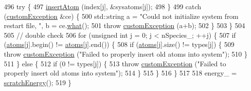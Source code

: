 \begin{DoxyCode}
496                                 \textcolor{keywordflow}{try} \{
497                                                 \hyperlink{classsim_system_a6c1e86f585f3a52aa82b6394ffbf1c6a}{insertAtom} (index[j], &sysatoms[j]);
498                                 \}
499                                 \textcolor{keywordflow}{catch} (\hyperlink{classcustom_exception}{customException} &ce) \{
500                                                 std::string a = \textcolor{stringliteral}{"Could not initialize system from restart
       file, "}, b = ce.\hyperlink{classcustom_exception_aeb6ab5848b038adfc68fde86a512f691}{what}();
501                                                 \textcolor{keywordflow}{throw} \hyperlink{classcustom_exception}{customException} (a+b);
502                                 \}
503                 \}
504                 
505                 \textcolor{comment}{// double check}
506                 \textcolor{keywordflow}{for} (\textcolor{keywordtype}{unsigned} \textcolor{keywordtype}{int} j = 0; j < nSpecies\_; ++j) \{
507                                 \textcolor{keywordflow}{if} (\hyperlink{classsim_system_a90421b19082f7fb8fc23b7264b1161e4}{atoms}[j].begin() != \hyperlink{classsim_system_a90421b19082f7fb8fc23b7264b1161e4}{atoms}[j].end()) \{
508                                                 \textcolor{keywordflow}{if} (\hyperlink{classsim_system_a90421b19082f7fb8fc23b7264b1161e4}{atoms}[j].size() != types[j]) \{
509                                                                 \textcolor{keywordflow}{throw} 
      \hyperlink{classcustom_exception}{customException} (\textcolor{stringliteral}{"Failed to properly insert old atoms into system"});
510                                                 \}
511                                 \} \textcolor{keywordflow}{else} \{
512                                                 \textcolor{keywordflow}{if} (0 != types[j]) \{
513                                                                 \textcolor{keywordflow}{throw} 
      \hyperlink{classcustom_exception}{customException} (\textcolor{stringliteral}{"Failed to properly insert old atoms into system"});
514                                                 \}
515                                 \}
516                 \}
517 
518                 energy\_ = \hyperlink{classsim_system_a51539ed4c3bb4905b32ce428c1c537fe}{scratchEnergy}();
519 \}
\end{DoxyCode}
\hypertarget{classsim_system_a11a8994c279ba6f643420f4be57a9b2d}{}
